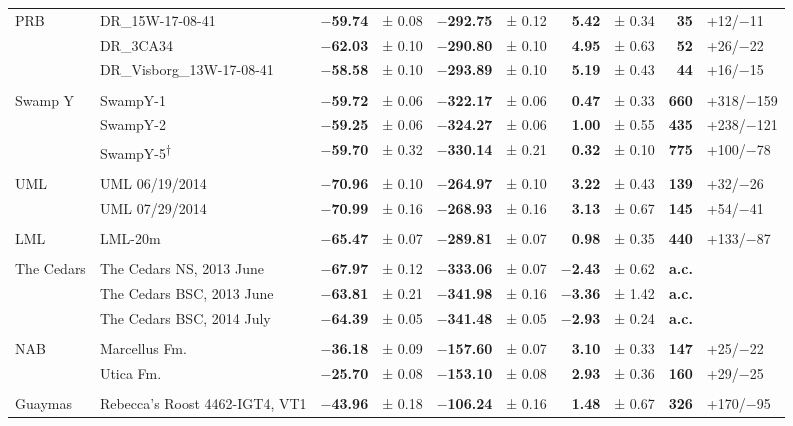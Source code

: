 \begin{landscape}
\begin{ThreePartTable}
\begin{longtable}[]{ll r@{\hspace{0.2em}}l r@{\hspace{0.2em}}l r@{\hspace{0.2em}}l r@{\hspace{0.2em}}l}
			\tabularnewline
			PRB & DR\_15W-17-08-41 & \textbf{$-$59.74} & ± 0.08 & \textbf{$-$292.75} &
			± 0.12 & \textbf{5.42} & ± 0.34 & \textbf{35} & +12/$-$11
			\tabularnewline
			& DR\_3CA34 & \textbf{$-$62.03} & ± 0.10 & \textbf{$-$290.80} & ± 0.10 &
			\textbf{4.95} & ± 0.63 & \textbf{52} & +26/$-$22 \tabularnewline
			& DR\_Visborg\_13W-17-08-41 & \textbf{$-$58.58} & ± 0.10 &
			\textbf{$-$293.89} & ± 0.10 & \textbf{5.19} & ± 0.43 & \textbf{44} &
			+16/$-$15 \tabularnewline
			
			\tabularnewline
			Swamp Y & SwampY-1 & \textbf{$-$59.72} & ± 0.06 & \textbf{$-$322.17} & ±
			0.06 & \textbf{0.47} & ± 0.33 & \textbf{660} & +318/$-$159
			\tabularnewline
			& SwampY-2 & \textbf{$-$59.25} & ± 0.06 & \textbf{$-$324.27} & ± 0.06 &
			\textbf{1.00} & ± 0.55 & \textbf{435} & +238/$-$121 \tabularnewline
			& SwampY-5\textsuperscript{†} & \textbf{$-$59.70} & ± 0.32 &
			\textbf{$-$330.14} & ± 0.21 & \textbf{0.32} & ± 0.10 & \textbf{775} &
			+100/$-$78 \tabularnewline
			
			\tabularnewline
			UML & UML 06/19/2014 & \textbf{$-$70.96} & ± 0.10 & \textbf{$-$264.97} & ±
			0.10 & \textbf{3.22} & ± 0.43 & \textbf{139} & +32/$-$26
			\tabularnewline
			& UML 07/29/2014 & \textbf{$-$70.99} & ± 0.16 & \textbf{$-$268.93} & ±
			0.16 & \textbf{3.13} & ± 0.67 & \textbf{145} & +54/$-$41
			\tabularnewline
			
			\tabularnewline
			LML & LML-20m & \textbf{$-$65.47} & ± 0.07 & \textbf{$-$289.81} & ± 0.07
			& \textbf{0.98} & ± 0.35 & \textbf{440} & +133/$-$87 \tabularnewline
			
			\tabularnewline
			The Cedars & The Cedars NS, 2013 June & \textbf{$-$67.97} & ± 0.12 &
			\textbf{$-$333.06} & ± 0.07 & \textbf{$-$2.43} & ± 0.62 & \textbf{a.c.}
			&\tabularnewline
			& The Cedars BSC, 2013 June & \textbf{$-$63.81} & ± 0.21 &
			\textbf{$-$341.98} & ± 0.16 & \textbf{$-$3.36} & ± 1.42 & \textbf{a.c.}
			&\tabularnewline
			& The Cedars BSC, 2014 July & \textbf{$-$64.39} & ± 0.05 &
			\textbf{$-$341.48} & ± 0.05 & \textbf{$-$2.93} & ± 0.24 & \textbf{a.c.}
			&\tabularnewline
			
			\tabularnewline
			NAB & Marcellus Fm. & \textbf{$-$36.18} & ± 0.09 & \textbf{$-$157.60} & ±
			0.07 & \textbf{3.10} & ± 0.33 & \textbf{147} & +25/$-$22
			\tabularnewline
			& Utica Fm. & \textbf{$-$25.70} & ± 0.08 & \textbf{$-$153.10} & ± 0.08 &
			\textbf{2.93} & ± 0.36 & \textbf{160} & +29/$-$25 \tabularnewline
			
			\tabularnewline
			Guaymas & Rebecca's Roost 4462-IGT4, VT1 & \textbf{$-$43.96} & ± 0.18 &
			\textbf{$-$106.24} & ± 0.16 & \textbf{1.48} & ± 0.67 & \textbf{326} &
			+170/$-$95 \tabularnewline
			

\end{longtable}
\end{ThreePartTable}
\end{landscape}
